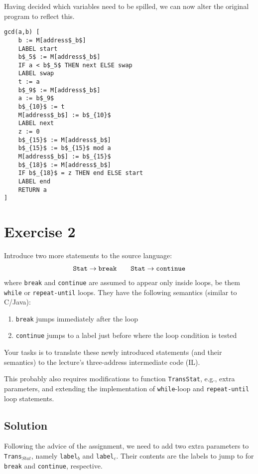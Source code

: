 \documentclass[11pt,a4paper]{article}
\begin{document}
\newpage
Having decided which variables need to be spilled, we can now alter the
original program to reflect this.
\begin{lstlisting}[mathescape]
gcd(a,b) [
	b := M[address$_b$]
	LABEL start
	b$_5$ := M[address$_b$]
	IF a < b$_5$ THEN next ELSE swap
	LABEL swap
	t := a
	b$_9$ := M[address$_b$]
	a := b$_9$
	b$_{10}$ := t
	M[address$_b$] := b$_{10}$
	LABEL next
	z := 0
	b$_{15}$ := M[address$_b$]
	b$_{15}$ := b$_{15}$ mod a
	M[address$_b$] := b$_{15}$
	b$_{18}$ := M[address$_b$]
	IF b$_{18}$ = z THEN end ELSE start
	LABEL end
	RETURN a
]
\end{lstlisting}

\newpage
\section{Exercise 2}
Introduce two more statements to the source language:
\begin{align*}
	\text{\tt Stat} \rightarrow \text{\tt break}
	\qquad
	\text{\tt Stat} \rightarrow \text{\tt continue}
\end{align*}
where {\tt break} and {\tt continue} are assumed to appear only inside loops,
be them {\tt while} or {\tt repeat-until} loops. They have  the following
semantics (similar to C/Java):
\begin{enumerate}
	\item {\tt break} jumps immediately after the loop
	\item {\tt continue} jumps to a label just before where the loop condition
	is tested
\end{enumerate}
Your tasks is to translate these newly introduced statements (and their
semantics) to the lecture's three-address intermediate code (IL).

This probably also requires modifications to function {\tt TransStat}, e.g.,
extra parameters, and extending the implementation of {\tt while}-loop and
{\tt repeat-until} loop statements.


\subsection*{Solution}
Following the advice of the assignment, we need to add two extra parameters to
{\tt Trans$_{Stat}$}, namely {\tt label$_b$} and {\tt label$_c$}. Their
contents are the labels to jump to for {\tt break} and {\tt continue},
respective.
\end{document}
